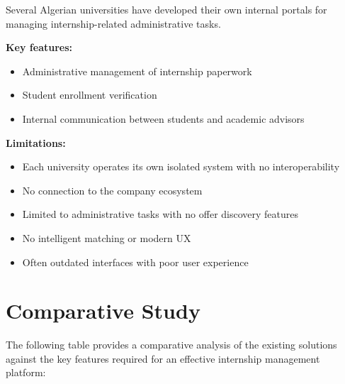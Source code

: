 Several Algerian universities have developed their own internal portals for managing internship-related administrative tasks.

\textbf{Key features:}
\begin{itemize}
    \item Administrative management of internship paperwork
    \item Student enrollment verification
    \item Internal communication between students and academic advisors
\end{itemize}

\textbf{Limitations:}
\begin{itemize}
    \item Each university operates its own isolated system with no interoperability
    \item No connection to the company ecosystem
    \item Limited to administrative tasks with no offer discovery features
    \item No intelligent matching or modern UX
    \item Often outdated interfaces with poor user experience
\end{itemize}

\section{Comparative Study}

The following table provides a comparative analysis of the existing solutions against the key features required for an effective internship management platform:

